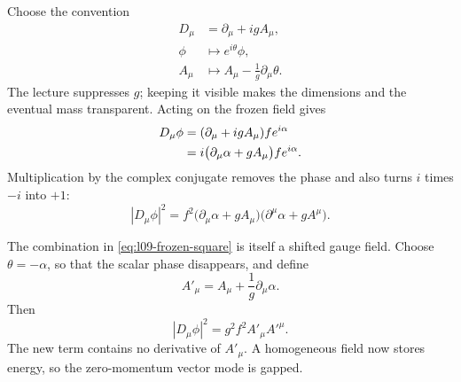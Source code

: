 Choose the convention
\begin{equation}
\begin{aligned}
  D_\mu&=\partial_\mu+igA_\mu,
  \\
  \phi&\longmapsto e^{i\theta}\phi,
  \\
  A_\mu&\longmapsto A_\mu-\frac1g\partial_\mu\theta .
\end{aligned}
  \label{eq:l09-gauge-convention}
\end{equation}
The lecture suppresses \(g\); keeping it visible makes the dimensions and
the eventual mass transparent. Acting on the frozen field gives
\begin{align}
  D_\mu\phi
  &=(\partial_\mu+igA_\mu)f e^{i\alpha}
  \notag\\
  &=i\bigl(\partial_\mu\alpha+gA_\mu\bigr)
    f e^{i\alpha}.
  \label{eq:l09-covariant-frozen}
\end{align}
Multiplication by the complex conjugate removes the phase and also turns
\(i\) times \(-i\) into \(+1\):
\begin{equation}
  |D_\mu\phi|^2
  =f^2
   \bigl(\partial_\mu\alpha+gA_\mu\bigr)
   \bigl(\partial^\mu\alpha+gA^\mu\bigr).
  \label{eq:l09-frozen-square}
\end{equation}

\begin{classroomqa}
\end{classroomqa}

The combination in \eqref{eq:l09-frozen-square} is itself a shifted gauge
field. Choose \(\theta=-\alpha\), so that the scalar phase disappears, and
define
\begin{equation}
  A'_\mu=A_\mu+\frac1g\partial_\mu\alpha .
  \label{eq:l09-unitary-gauge-field}
\end{equation}
Then
\begin{equation}
  |D_\mu\phi|^2=g^2f^2 A'_\mu A'^\mu .
  \label{eq:l09-vector-mass-term}
\end{equation}
The new term contains no derivative of \(A'_\mu\). A homogeneous field now
stores energy, so the zero-momentum vector mode is gapped.

